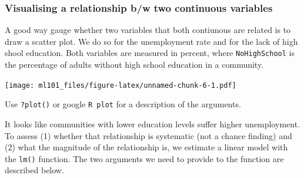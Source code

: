 \documentclass[]{article}
\newenvironment{Shaded}{\begin{snugshade}}{\end{snugshade}}
\newcommand{\DataTypeTok}[1]{\textcolor[rgb]{0.13,0.29,0.53}{#1}}
\newcommand{\DecValTok}[1]{\textcolor[rgb]{0.00,0.00,0.81}{#1}}
\newcommand{\KeywordTok}[1]{\textcolor[rgb]{0.13,0.29,0.53}{\textbf{#1}}}
\newcommand{\NormalTok}[1]{#1}
\newcommand{\OperatorTok}[1]{\textcolor[rgb]{0.81,0.36,0.00}{\textbf{#1}}}
\newcommand{\StringTok}[1]{\textcolor[rgb]{0.31,0.60,0.02}{#1}}
\begin{document}
\hypertarget{visualising-a-relationship-bw-two-continuous-variables}{%
\subsubsection{Visualising a relationship b/w two continuous variables}\label{visualising-a-relationship-bw-two-continuous-variables}}

A good way gauge whether two variables that both contiunous are related is to draw a scatter plot. We do so for the unemployment rate and for the lack of high shool education. Both variables are measured in percent, where \texttt{NoHighSchool} is the percentage of adults without high school education in a community.

\begin{Shaded}
\end{Shaded}

\texttt{[image: ml101\_files/figure-latex/unnamed-chunk-6-1.pdf]}

Use \texttt{?plot()} or google \texttt{R\ plot} for a description of the arguments.

It looks like communities with lower education levels suffer higher unemployment. To assess (1) whether that relationship is systematic (not a chance finding) and (2) what the magnitude of the relationship is, we estimate a linear model with the \texttt{lm()} function. The two arguments we need to provide to the function are described below.
\end{document}
